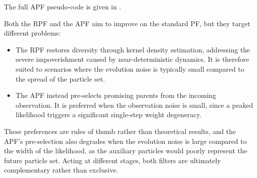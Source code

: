 The full APF pseudo-code is given in .

\begin{algorithm}[!htb]
	\begin{algorithmic}
	\end{algorithmic}\caption{Auxiliary Particle Filter}\label{alg:APF}
\end{algorithm}

\begin{remark}
	Both the RPF and the APF aim to improve on the standard PF, but they target different problems:
	\begin{itemize}
		\item The RPF restores diversity through kernel density estimation, addressing the severe impoverishment caused by near-deterministic dynamics. It is therefore suited to scenarios where the evolution noise is typically small compared to the spread of the particle set.
		\item The APF instead pre-selects promising parents from the incoming observation. It is preferred when the observation noise is small, since a peaked likelihood triggers a significant single-step weight degeneracy.
	\end{itemize}

	These preferences are rules of thumb rather than theoretical results, and the APF's pre-selection also degrades when the evolution noise is large compared to the width of the likelihood, as the auxiliary particles would poorly represent the future particle set. Acting at different stages, both filters are ultimately complementary rather than exclusive.
\end{remark}


